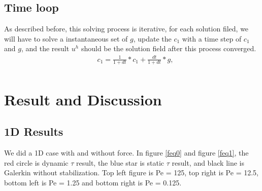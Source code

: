 \documentclass[10pt]{article}
\begin{document}
\subsection{Time loop}
As described before, this solving process is iterative, for each solution filed, we will have to solve a instantaneous set of $g$, update the $c_{1}$ with a time step of $c_{1}$ and  $g$, and the result $u^{h}$ should be the solution field after this process converged. \\
\begin{equation}
    \begin{aligned}
       \quad c_{1}  = \frac{1}{1+dt}*c_{1}+\frac{dt}{1+dt}*g,   \\
    \end{aligned}\label{eq:23} 
\end{equation}

\section{Result and Discussion}

\subsection{1D Results}
We did a 1D case with and without force. In figure \ref{feq0} and figure \ref{feq1}, the red circle is dynamic  $\tau$ result, the blue star is static $\tau$ result, and black line is Galerkin without stabilization. Top left figure is Pe = 125, top right is Pe = 12.5, bottom left is Pe = 1.25 and bottom right is Pe = 0.125.
\end{document}
